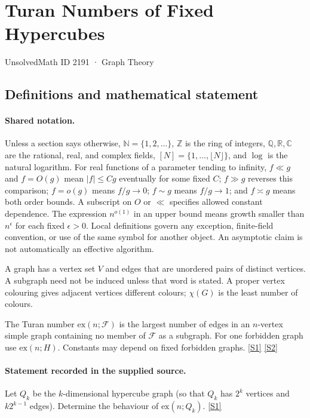 \documentclass[11pt,a4paper]{article}
\newcommand{\N}{\mathbb{N}}
\newcommand{\Z}{\mathbb{Z}}
\newcommand{\Q}{\mathbb{Q}}
\newcommand{\R}{\mathbb{R}}
\newcommand{\C}{\mathbb{C}}
\newcommand{\sref}[2]{\hyperlink{source:#1:#2}{[S#2]}}
\begin{document}

\setcounter{section}{2190}

\section{Turan Numbers of Fixed Hypercubes}\label{2191}

{\small\sffamily UnsolvedMath ID 2191 · Graph Theory}

\subsection{Definitions and mathematical statement}

\paragraph{Shared notation.}Unless a section says otherwise, $\N=\{1,2,\ldots\}$,
$\Z$ is the ring of integers, $\Q,\R,\C$ are the rational, real, and complex
fields, $[N]=\{1,\ldots,\lfloor N\rfloor\}$, and $\log$ is the natural
logarithm. For real functions of a parameter tending to infinity,
$f\ll g$ and $f=O(g)$ mean $|f|\leq Cg$ eventually for some fixed $C$;
$f\gg g$ reverses this comparison; $f=o(g)$ means $f/g\to0$;
$f\sim g$ means $f/g\to1$; and $f\asymp g$ means both order bounds.
A subscript on $O$ or $\ll$ specifies allowed constant dependence.
The expression $n^{o(1)}$ in an upper bound means growth smaller than
$n^\epsilon$ for each fixed $\epsilon>0$. Local definitions govern any
exception, finite-field convention, or use of the same symbol for another
object. An asymptotic claim is not automatically an effective algorithm.



A graph has a vertex set $V$ and edges that are unordered pairs of distinct vertices. A subgraph need not be induced unless that word is stated. A proper vertex colouring gives adjacent vertices different colours; $\chi(G)$ is the least number of colours.

The Turan number $\mathrm{ex}(n;\mathcal F)$ is the largest number of edges in an $n$-vertex simple graph containing no member of $\mathcal F$ as a subgraph. For one forbidden graph use $\mathrm{ex}(n;H)$. Constants may depend on fixed forbidden graphs. \sref{2191}{1} \sref{2191}{2}

\paragraph{Statement recorded in the supplied source.}
Let $Q_k$ be the $k$-dimensional hypercube graph (so that $Q_k$ has $2^k$ vertices and $k2^{k-1}$ edges). Determine the behaviour of $ \mathrm{ex}(n;Q_k). $ \sref{2191}{1}
\end{document}
